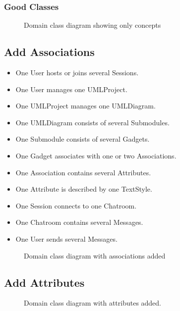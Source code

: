 \documentclass[12pt]{article}
\begin{document}
    \subsubsection{Good Classes}

    \begin{figure}[H]
        \centering
        
        \caption{Domain class diagram showing only concepts}
        \label{fig:dm}
    \end{figure}

    \subsection{Add Associations}
    \begin{itemize}
        \item One User hosts or joins several Sessions.
        \item One User manages one UMLProject.
        \item One UMLProject manages one UMLDiagram.
        \item One UMLDiagram consists of several Submodules.
        \item One Submodule consists of several Gadgets.
        \item One Gadget associates with one or two Associations.
        \item One Association contains several Attributes.
        \item One Attribute is described by one TextStyle.
        \item One Session connects to one Chatroom.
        \item One Chatroom contains several Messages.
        \item One User sends several Messages.
    \end{itemize}


    \begin{figure}[H]
        \centering
        
        \caption{Domain class diagram with associations added}
        \label{fig:dmWithAss}
    \end{figure}

    \subsection{Add Attributes}

    \begin{figure}[H]
        \centering
        
        \caption{Domain class diagram with attributes added.}
        \label{fig:dmWithAssAndAtt}
    \end{figure}
\end{document}
